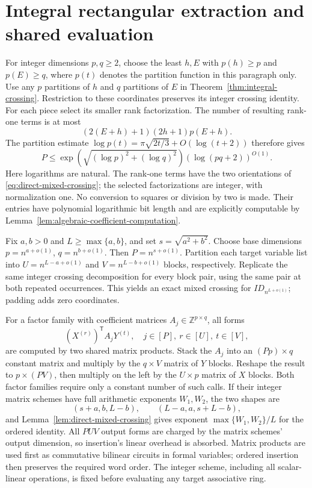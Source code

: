\section{Integral rectangular extraction and shared evaluation}
\label{sec:rectangular-hurwitz}
For integer dimensions $p,q\ge2$, choose the least $h,E$ with
$p(h)\ge p$ and $p(E)\ge q$, where $p(t)$ denotes the partition
function in this paragraph only. Use any $p$ partitions of $h$ and $q$
partitions of $E$ in Theorem~\ref{thm:integral-crossing}. Restriction to
these coordinates preserves its integer crossing identity. For each
piece select its smaller rank factorization. The number of resulting
rank-one terms is at most
\[
 (2(E+h)+1)(2h+1)p(E+h).
\]
The partition estimate
$\log p(t)=\pi\sqrt{2t/3}+O(\log(t+2))$
\cite{hardyramanujan1918} therefore gives
\[
 P\le\exp\!\left(\sqrt{(\log p)^2+(\log q)^2}\right)
      (\log(pq+2))^{O(1)}.
\]
Here logarithms are natural. The rank-one terms have the two orientations
of \eqref{eq:direct-mixed-crossing}; the selected factorizations are
integer, with normalization one. No conversion to squares or division
by two is made. Their entries have polynomial logarithmic bit length
and are explicitly computable by
Lemma~\ref{lem:algebraic-coefficient-computation}.

Fix $a,b>0$ and $L\ge\max\{a,b\}$, and set
$s=\sqrt{a^2+b^2}$. Choose base dimensions
$p=n^{a+o(1)}$, $q=n^{b+o(1)}$. Then
$P=n^{s+o(1)}$. Partition each target variable list into
$U=n^{L-a+o(1)}$ and $V=n^{L-b+o(1)}$ blocks, respectively.
Replicate the same integer crossing decomposition for every block pair,
using the same pair at both repeated occurrences. This yields an exact
mixed crossing for $ID_{n^{L+o(1)}}$; padding adds zero coordinates.

For a factor family with coefficient matrices $A_j\in\mathbb Z^{p\times q}$,
all forms
\[
 (X^{(r)})^{\mathsf T}A_jY^{(t)},
 \quad j\in[P],\ r\in[U],\ t\in[V],
\]
are computed by two shared matrix products. Stack the $A_j$ into an
$(Pp)\times q$ constant matrix and multiply by the $q\times V$ matrix
of $Y$ blocks. Reshape the result to $p\times(PV)$, then multiply on
the left by the $U\times p$ matrix of $X$ blocks. Both factor families
require only a constant number of such calls. If their integer matrix
schemes have full arithmetic exponents $W_1,W_2$, the two shapes are
\[
 (s+a,b,L-b),\qquad (L-a,a,s+L-b),
\]
and Lemma~\ref{lem:direct-mixed-crossing} gives exponent
$\max\{W_1,W_2\}/L$ for the ordered identity. All $PUV$ output forms
are charged by the matrix schemes' output dimension, so insertion's
linear overhead is absorbed. Matrix products are used first as
commutative bilinear circuits in formal variables; ordered insertion
then preserves the required word order. The integer scheme, including
all scalar-linear operations, is fixed before evaluating any target
associative ring.

